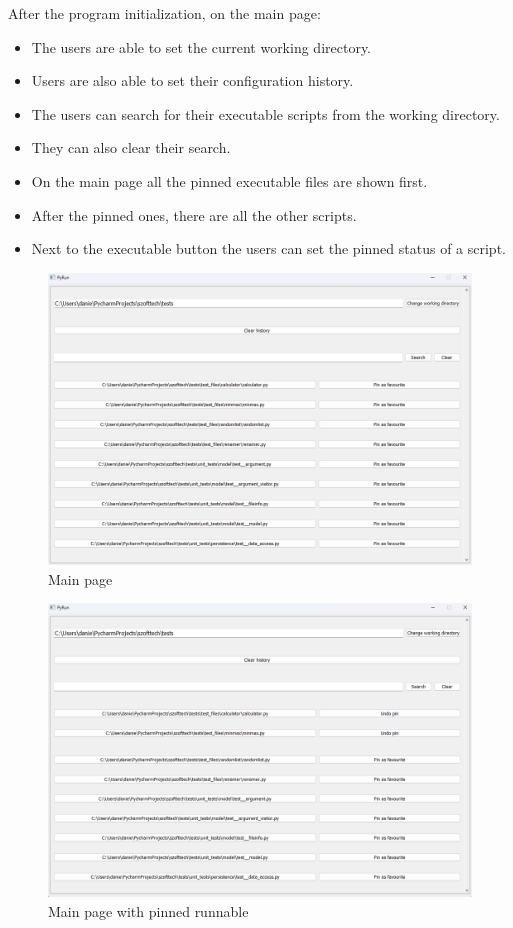 \documentclass{article}
\begin{document}
After the program initialization, on the main page:
\begin{itemize}
    \item The users are able to set the current working directory.
    \item Users are also able to set their configuration history.
    \item The users can search for their executable scripts from the working directory.
    \item They can also clear their search.
    \item On the main page all the pinned executable files are shown first.
    \item After the pinned ones, there are all the other scripts.
    \item Next to the executable button the users can set the pinned status of a script.
\end{itemize}

\begin{figure}[h]
    \centering
    \includegraphics[width=1\linewidth]{img/main_page.png}
    \caption{Main page}
    \label{fig:enter-label}
\end{figure}

\begin{figure}[h]
    \centering
    \includegraphics[width=1\linewidth]{img/pinned.png}
    \caption{Main page with pinned runnable}
    \label{fig:enter-label}
\end{figure}
\end{document}
